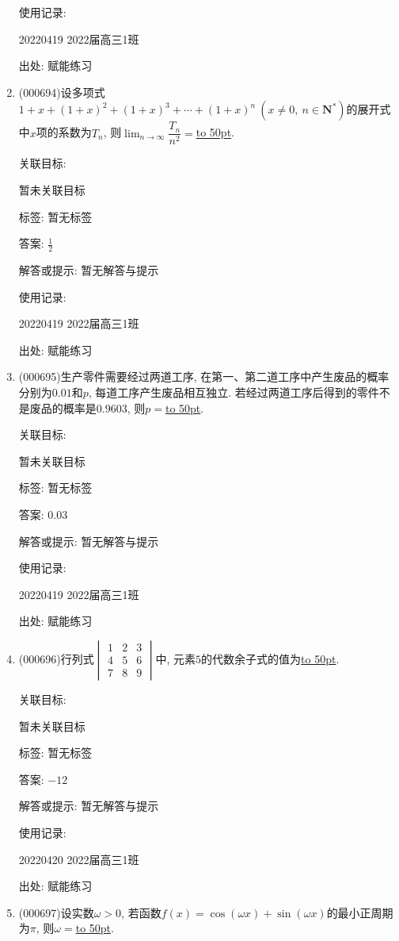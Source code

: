 \documentclass[10pt,a4paper]{article}
\newcommand{\blank}[1]{\underline{\hbox to #1pt{}}}
\begin{document}
\begin{enumerate}[1.]
使用记录:

20220419	2022届高三1班	


出处: 赋能练习
\item { (000694)}设多项式$1+x+(1+x)^2+(1+x)^3+\cdots+(1+x)^n\ (x\ne 0, \ n\in \mathbf{N}^*)$的展开式中$x$项的系数为$T_n$, 则$\displaystyle\lim_{n\to \infty}\dfrac{T_n}{n^2}=$\blank{50}.


关联目标:

暂未关联目标



标签: 暂无标签

答案: $\frac 12$

解答或提示: 暂无解答与提示

使用记录:

20220419	2022届高三1班	


出处: 赋能练习
\item { (000695)}生产零件需要经过两道工序, 在第一、第二道工序中产生废品的概率分别为$0.01$和$p$, 每道工序产生废品相互独立. 若经过两道工序后得到的零件不是废品的概率是$0.9603$, 则$p=$\blank{50}.


关联目标:

暂未关联目标



标签: 暂无标签

答案: $0.03$

解答或提示: 暂无解答与提示

使用记录:

20220419	2022届高三1班	


出处: 赋能练习
\item { (000696)}行列式$\begin{vmatrix} 1 & 2 & 3 \\ 4 & 5 & 6  \\ 7 & 8 & 9 \end{vmatrix}$中, 元素$5$的代数余子式的值为\blank{50}.


关联目标:

暂未关联目标



标签: 暂无标签

答案: $-12$

解答或提示: 暂无解答与提示

使用记录:

20220420	2022届高三1班	


出处: 赋能练习
\item { (000697)}设实数$\omega>0$, 若函数$f(x)=\cos(\omega x)+\sin(\omega x)$的最小正周期为$\pi$, 则$\omega=$\blank{50}.



\end{enumerate}
\end{document}
